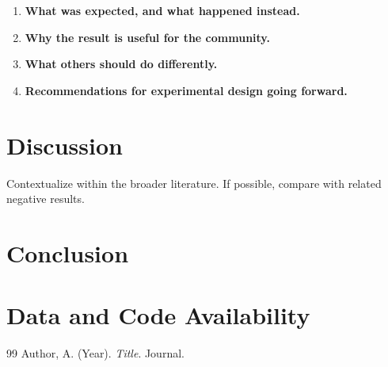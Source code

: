 \documentclass[12pt,a4paper]{article}
\begin{document}
\begin{enumerate}
    \item \textbf{What was expected, and what happened instead.}
    \item \textbf{Why the result is useful for the community.}
    \item \textbf{What others should do differently.}
    \item \textbf{Recommendations for experimental design going forward.}
\end{enumerate}

\section{Discussion}
Contextualize within the broader literature. If possible, compare with related
negative results.

\section{Conclusion}
\section*{Data and Code Availability}


\begin{thebibliography}{99}
 Author, A. (Year). \textit{Title}. Journal.
\end{thebibliography}
\end{document}
